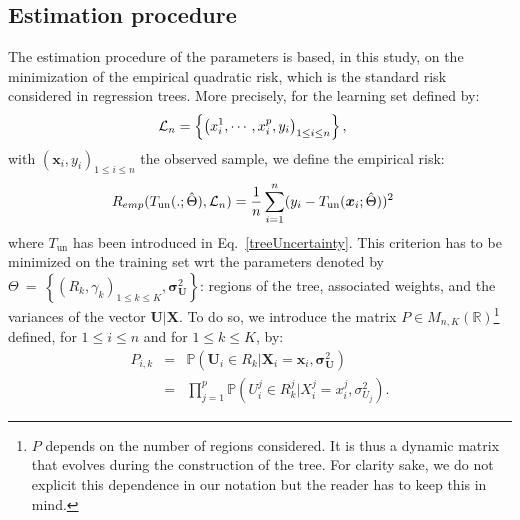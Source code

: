 \subsection{Estimation procedure}

The estimation procedure of the parameters is based, in this study, on the minimization of the empirical quadratic risk, which is the standard risk considered in regression trees. More precisely, for the learning set defined by:
%
 \begin{align}
    {\cal L}_n&=\left\{\left(x_i^1,\cdots,x_i^{p} , y_i\right)_{1\leq i \leq n}
    \right\},
\label{learning_set}
\end{align}
%
with $(\boldsymbol{x}_i, y_i)_{1\leq i \leq n}$ the observed sample, we define the empirical risk:
%
\begin{align}
    R_{emp}(T_{\text{un}}(.;\hat{\Theta}), {\cal L}_n) &= 
    \frac{1}{n} \sum_{i=1}^n (y_i - T_{\text{un}}(\boldsymbol{x}_i;\hat{\Theta}))^2
\label{empiricalRisk}
\end{align}
%
where $T_{\text{un}}$ has been introduced in Eq.~\eqref{treeUncertainty}. This criterion has to be minimized on the training set wrt the parameters denoted by $\Theta~=~\left\{(R_k, \gamma_k)_{1\leq k \leq K},\boldsymbol{\sigma}_{\boldsymbol{U}}^2\right\} $: regions of the tree, associated weights, and the variances of  the vector $\boldsymbol{U|X}$. To do so, we introduce  the matrix $P \in M_{n,K} (\mathbb{R})$\footnote{$P$ depends on the number of regions considered. It is thus a dynamic matrix that evolves during the construction of the tree. For clarity sake, we do not explicit this dependence in our notation but the reader has to keep this in mind.} defined, for $1\leq i\leq n$ and for $1\leq k \leq K$, by:
%
\begin{eqnarray}\label{eq:def-P}
P_{i,k} & = &\mathbb{P}\left(\boldsymbol{U}_i \in R_{k}| \boldsymbol{X}_i = \boldsymbol{x}_i ,\boldsymbol{\sigma}_{\boldsymbol{U}}^2\right) \nonumber \\
 & = & \prod_{j=1}^{p} \mathbb{P}\left(U_i^j \in R_{k}^j| X^j_i = x^j_i,\sigma_{U_j}^2 \right). \nonumber
\end{eqnarray}
%


